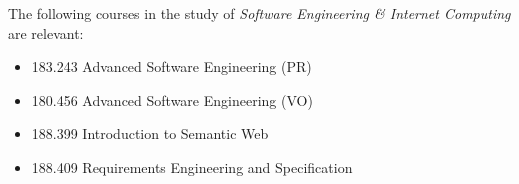 \documentclass[12pt, notitlepage]{article}
\begin{document}
The following courses in the study of \emph{Software Engineering \& Internet Computing} are relevant:
\begin{itemize}
	\item 183.243 Advanced Software Engineering (PR)
	\item 180.456 Advanced Software Engineering (VO)
	\item 188.399 Introduction to Semantic Web
	\item 188.409 Requirements Engineering and Specification
\end{itemize}

\newpage


\end{document}
